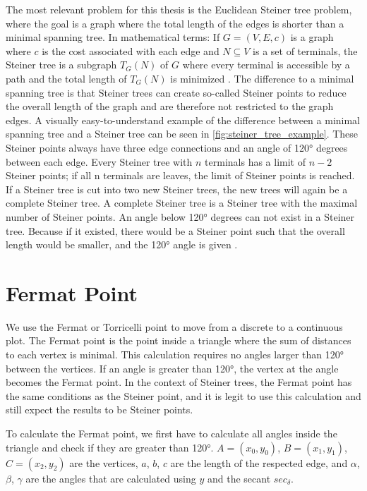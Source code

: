 The most relevant problem for this thesis is the Euclidean Steiner tree problem, where the goal is a graph where the total length of the edges is shorter than a minimal spanning tree. In mathematical terms: If $G = (V, E, c)$ is a graph where $c$ is the cost associated with each edge and $N \subseteq V$ is a set of terminals, the Steiner tree is a subgraph $T_G(N)$ of $G$ where every terminal is accessible by a path and the total length of $T_G(N)$ is minimized \cite{byrka_steiner_2013}. The difference to a minimal spanning tree is that Steiner trees can create so-called Steiner points to reduce the overall length of the graph \cite{noauthor_steiner_2022} and are therefore not restricted to the graph edges. A visually easy-to-understand example of the difference between a minimal spanning tree and a Steiner tree can be seen in \autoref{fig:steiner_tree_example}. These Steiner points always have three edge connections and an angle of 120° degrees between each edge. Every Steiner tree with $n$ terminals has a limit of $n - 2$ Steiner points; if all n terminals are leaves, the limit of Steiner points is reached. If a Steiner tree is cut into two new Steiner trees, the new trees will again be a complete Steiner tree. A complete Steiner tree is a Steiner tree with the maximal number of Steiner points. An angle below 120° degrees can not exist in a Steiner tree. Because if it existed, there would be a Steiner point such that the overall length would be smaller, and the 120° angle is given \cite{noauthor_steinerbaumproblem_2021}.

\section{Fermat Point}
\label{sec:fermat_point}

We use the Fermat or Torricelli point to move from a discrete to a continuous plot. The Fermat point is the point inside a triangle where the sum of distances to each vertex is minimal. This calculation requires no angles larger than 120° between the vertices. If an angle is greater than 120°, the vertex at the angle becomes the Fermat point. In the context of Steiner trees, the Fermat point has the same conditions as the Steiner point, and it is legit to use this calculation and still expect the results to be Steiner points. 

To calculate the Fermat point, we first have to calculate all angles inside the triangle and check if they are greater than 120°. $A = (x_0, y_0)$, $B = (x_1, y_1)$, $C = (x_2, y_2)$ are the vertices,  $a$, $b$, $c$ are the length of the respected edge, and $\alpha$, $\beta$, $\gamma$ are the angles that are calculated using $y$ and the secant $sec_{\delta}$.

